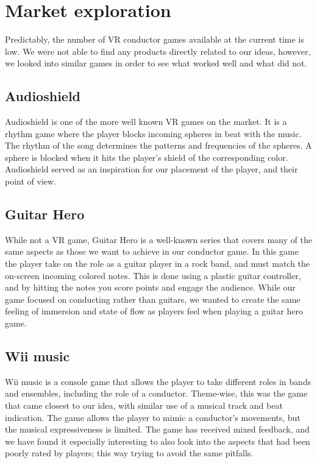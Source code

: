 \section{Market exploration}
Predictably, the number of VR conductor games available at the current time is low. We were not able to find any products directly related to our ideas, however, we looked into similar games in order to see what worked well and what did not.  

\subsection{Audioshield}
Audioshield is one of the more well known VR games on the market. It is a rhythm game where the player blocks incoming spheres in beat with the music. The rhythm of the song determines the patterns and frequencies of the spheres. A sphere is blocked when it hits the player’s shield of the corresponding color. Audioshield served as an inspiration for our placement of the player, and their point of view.

\subsection{Guitar Hero}
While not a VR game, Guitar Hero is a well-known series that covers many of the same aspects as those we want to achieve in our conductor game. In this game the player take on the role as a guitar player in a rock band, and must match the on-screen incoming colored notes. This is done using a plastic guitar controller, and by hitting the notes you score points and engage the audience. While our game focused on conducting rather than guitars, we wanted to create the same feeling of immersion and state of flow as players feel when playing a guitar hero game.

\subsection{Wii music}
Wii music is a console game that allows the player to take different roles in bands and ensembles, including the role of a conductor. Theme-wise, this was the game that came closest to our idea, with similar use of a musical track and beat indication. The game allows the player to mimic a conductor’s movements, but the musical expressiveness is limited. The game has received mixed feedback, and we have found it especially interesting to also look into the aspects that had been poorly rated by players; this way trying to avoid the same pitfalls.